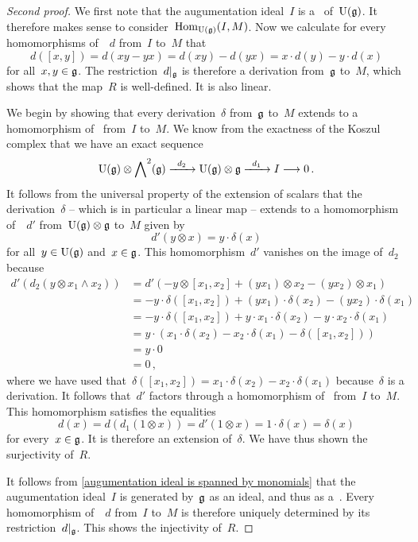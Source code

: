 \begin{proof}[Second proof]
	We first note that the augumentation ideal~$I$ is a~\submodule{$\Univ(\glie)$} of~$\Univ(\glie)$.
	It therefore makes sense to consider~$\operatorname{Hom}_{\operatorname{U}(\mathfrak{g})}(I, M)$.
	Now we calculate for every homomorphisms of~\modules{$\Univ(\glie)$}~$d$ from~$I$ to~$M$ that
	\[
		d([x,y])
		=
		d(xy - yx)
		=
		d(xy) - d(yx)
		=
		x \cdot d(y) - y \cdot d(x)
	\]
	for all~$x, y \in \mathfrak{g}$.
	The restriction~$\restrict{d}{\glie}$ is therefore a derivation from~$\mathfrak{g}$ to~$M$, which shows that the map~$R$ is well-defined.
	It is also linear.

	We begin by showing that every derivation~$\delta$ from~$\mathfrak{g}$ to~$M$ extends to a homomorphism of~\modules{$\Univ(\glie)$} from~$I$ to~$M$.
	We know from the exactness of the Koszul complex that we have an exact sequence
	\[
		\Univ(\glie) \otimes \Exterior^2(\glie)
		\xto{d_2}
		\Univ(\glie) \otimes \glie
		\xto{d_1}
		I
		\to
		0 \,.
	\]
	It follows from the universal property of the extension of scalars that the derivation~$\delta$ -- which is in particular a linear map -- extends to a homomorphism of~\modules{$\Univ(\glie)$}~$d'$ from~$\operatorname{U}(\mathfrak{g}) \otimes \mathfrak{g}$ to~$M$ given by
	\[
		d'(y \otimes x)
		=
		y \cdot \delta(x)
	\]
	for all~$y \in \operatorname{U}(\mathfrak{g})$ and~$x \in \mathfrak{g}$.
	This homomorphism~$d'$ vanishes on the image of~$d_2$ because
	\begin{align*}
		d'( d_2(y \otimes x_1 \wedge x_2) )
		&=
		d'
		(
			- y \otimes [x_1, x_2]
			+ (y x_1) \otimes x_2
			- (y x_2) \otimes x_1
		)
		\\
		&=
		- y \cdot \delta([x_1, x_2])
		+ (y x_1) \cdot \delta(x_2)
		- (y x_2) \cdot \delta(x_1)
		\\
		&=
		- y \cdot \delta([x_1, x_2])
		+ y \cdot x_1 \cdot \delta(x_2)
		- y \cdot x_2 \cdot \delta(x_1)
		\\
		&=
		y \cdot
		(
			x_1 \cdot \delta(x_2)
			- x_2 \cdot \delta(x_1)
			- \delta([x_1, x_2])
		)
		\\
		&=
		y \cdot 0
		\\
		&=
		0 \,,
	\end{align*}
	where we have used that~$\delta([x_1, x_2]) = x_1 \cdot \delta(x_2) - x_2 \cdot \delta(x_1)$ because~$\delta$ is a derivation.
	It follows that~$d'$ factors through a homomorphism of~\modules{$\Univ(\glie)$} from~$I$ to~$M$.
	This homomorphism satisfies the equalities
	\[
		d(x)
		=
		d( d_1(1 \otimes x) )
		=
		d'( 1 \otimes x )
		=
		1 \cdot \delta(x)
		=
		\delta(x)
	\]
	for every~$x \in \mathfrak{g}$.
	It is therefore an extension of~$\delta$.
	We have thus shown the surjectivity of~$R$.

	It follows from \cref{augumentation ideal is spanned by monomials} that the augumentation ideal~$I$ is generated by~$\mathfrak{g}$ as an ideal, and thus as a~\module{$\Univ(\glie)$}.
	Every homomorphism of~\modules{$\Univ(\glie)$}~$d$ from~$I$ to~$M$ is therefore uniquely determined by its restriction~$\restrict{d}{\glie}$.
	This shows the injectivity of~$R$.
\end{proof}


